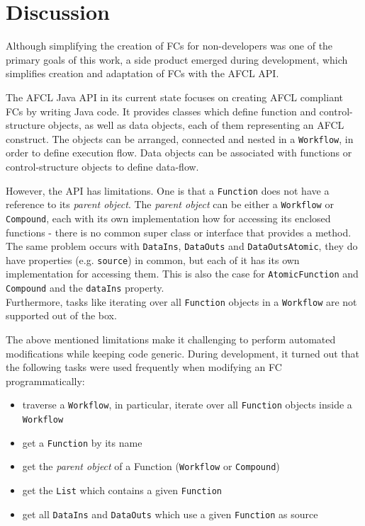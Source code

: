 \documentclass[a4paper,top=25mm,bottom=25mm,12pt,pdftex,halfparskip,twoside,openany,bibtotoc,numbers=noenddot]{scrbook}
\begin{document}
\chapter{Discussion}
\label{chap:discussion}

Although simplifying the creation of FCs for non-developers was one of the primary goals of this work, a side product emerged during development, which simplifies creation and adaptation of FCs with the AFCL API.

The AFCL Java API in its current state focuses on creating AFCL compliant FCs by writing Java code. It provides classes which define function and control-structure objects, as well as data objects, each of them representing an AFCL construct. The objects can be arranged, connected and nested in a \texttt{Workflow}, in order to define execution flow. Data objects can be associated with functions or control-structure objects to define data-flow.

However, the API has limitations. One is that a \texttt{Function} does not have a reference to its \textit{parent object}. The \textit{parent object} can be either a \texttt{Workflow} or \texttt{Compound}, each with its own implementation how for accessing its enclosed functions - there is no common super class or interface that provides a method. The same problem occurs with \texttt{DataIns}, \texttt{DataOuts} and \texttt{DataOutsAtomic}, they do have properties (e.g. \texttt{source}) in common, but each of it has its own implementation for accessing them. This is also the case for \texttt{AtomicFunction} and \texttt{Compound} and the \texttt{dataIns} property.\\
Furthermore, tasks like iterating over all \texttt{Function} objects in a \texttt{Workflow} are not supported out of the box.

The above mentioned limitations make it challenging to perform automated modifications while keeping code generic.
During development, it turned out that the following tasks were used frequently when modifying an FC programmatically:

\clearpage

\begin{itemize}
    \item traverse a \texttt{Workflow}, in particular, iterate over all \texttt{Function} objects inside a \texttt{Workflow}
	\item get a \texttt{Function} by its name
	\item get the \textit{parent object} of a Function (\texttt{Workflow} or \texttt{Compound})
	\item get the \texttt{List} which contains a given \texttt{Function}
	\item get all \texttt{DataIns} and \texttt{DataOuts} which use a given \texttt{Function} as source
\end{itemize}
\end{document}
